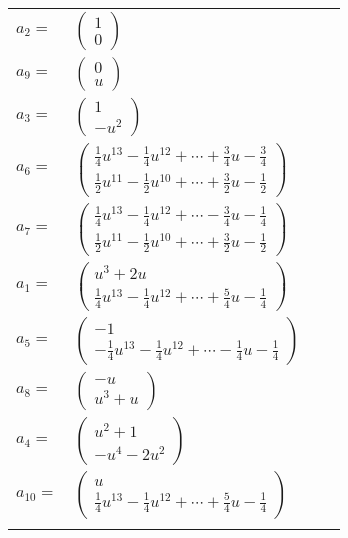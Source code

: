 \documentclass[1p]{elsarticle_modified}
\theoremstyle{definition}
\begin{document}
\begin{tabular}{m{7pt} m{180pt} m{7pt} m{180pt} }
\flushright $a_{2}=$&$\begin{pmatrix}1\\0\end{pmatrix}$ \\
\flushright $a_{9}=$&$\begin{pmatrix}0\\u\end{pmatrix}$ \\
\flushright $a_{3}=$&$\begin{pmatrix}1\\- u^2\end{pmatrix}$ \\
\flushright $a_{6}=$&$\begin{pmatrix}\frac{1}{4} u^{13}-\frac{1}{4} u^{12}+\cdots+\frac{3}{4} u-\frac{3}{4}\\\frac{1}{2} u^{11}-\frac{1}{2} u^{10}+\cdots+\frac{3}{2} u-\frac{1}{2}\end{pmatrix}$ \\
\flushright $a_{7}=$&$\begin{pmatrix}\frac{1}{4} u^{13}-\frac{1}{4} u^{12}+\cdots-\frac{3}{4} u-\frac{1}{4}\\\frac{1}{2} u^{11}-\frac{1}{2} u^{10}+\cdots+\frac{3}{2} u-\frac{1}{2}\end{pmatrix}$ \\
\flushright $a_{1}=$&$\begin{pmatrix}u^3+2 u\\\frac{1}{4} u^{13}-\frac{1}{4} u^{12}+\cdots+\frac{5}{4} u-\frac{1}{4}\end{pmatrix}$ \\
\flushright $a_{5}=$&$\begin{pmatrix}-1\\-\frac{1}{4} u^{13}-\frac{1}{4} u^{12}+\cdots-\frac{1}{4} u-\frac{1}{4}\end{pmatrix}$ \\
\flushright $a_{8}=$&$\begin{pmatrix}- u\\u^3+u\end{pmatrix}$ \\
\flushright $a_{4}=$&$\begin{pmatrix}u^2+1\\- u^4-2 u^2\end{pmatrix}$ \\
\flushright $a_{10}=$&$\begin{pmatrix}u\\\frac{1}{4} u^{13}-\frac{1}{4} u^{12}+\cdots+\frac{5}{4} u-\frac{1}{4}\end{pmatrix}$\\&\end{tabular}
\end{document}
